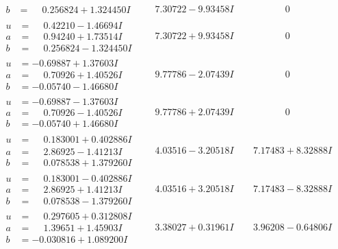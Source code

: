 \documentclass[1p]{elsarticle_modified}
\theoremstyle{definition}
\begin{document}
$$\begin{array}{c|c|c}
\begin{aligned}
b &= \phantom{-}0.256824 + 1.324450 I\end{aligned}
 & \phantom{-}7.30722 - 9.93458 I & \phantom{-0.000000 } 0 \\ \hline\begin{aligned}
u &= \phantom{-}0.42210 - 1.46694 I \\
a &= \phantom{-}0.94240 + 1.73514 I \\
b &= \phantom{-}0.256824 - 1.324450 I\end{aligned}
 & \phantom{-}7.30722 + 9.93458 I & \phantom{-0.000000 } 0 \\ \hline\begin{aligned}
u &= -0.69887 + 1.37603 I \\
a &= \phantom{-}0.70926 + 1.40526 I \\
b &= -0.05740 - 1.46680 I\end{aligned}
 & \phantom{-}9.77786 - 2.07439 I & \phantom{-0.000000 } 0 \\ \hline\begin{aligned}
u &= -0.69887 - 1.37603 I \\
a &= \phantom{-}0.70926 - 1.40526 I \\
b &= -0.05740 + 1.46680 I\end{aligned}
 & \phantom{-}9.77786 + 2.07439 I & \phantom{-0.000000 } 0 \\ \hline\begin{aligned}
u &= \phantom{-}0.183001 + 0.402886 I \\
a &= \phantom{-}2.86925 - 1.41213 I \\
b &= \phantom{-}0.078538 + 1.379260 I\end{aligned}
 & \phantom{-}4.03516 - 3.20518 I & \phantom{-}7.17483 + 8.32888 I \\ \hline\begin{aligned}
u &= \phantom{-}0.183001 - 0.402886 I \\
a &= \phantom{-}2.86925 + 1.41213 I \\
b &= \phantom{-}0.078538 - 1.379260 I\end{aligned}
 & \phantom{-}4.03516 + 3.20518 I & \phantom{-}7.17483 - 8.32888 I \\ \hline\begin{aligned}
u &= \phantom{-}0.297605 + 0.312808 I \\
a &= \phantom{-}1.39651 + 1.45903 I \\
b &= -0.030816 + 1.089200 I\end{aligned}
 & \phantom{-}3.38027 + 0.31961 I & \phantom{-}3.96208 - 0.64806 I \\ \hline\begin{aligned}

\end{aligned}
\end{array}$$
\end{document}
